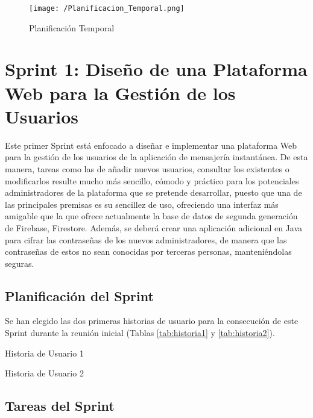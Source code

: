 \begin{figure}[!h]
	\begin{center}
		\texttt{[image: /Planificacion\_Temporal.png]}
		\caption{Planificación Temporal}
		\label{fig:plantempo}
	\end{center}
\end{figure}

\clearpage

\section{Sprint 1: Diseño de una Plataforma Web para la Gestión de los Usuarios}
Este primer Sprint está enfocado a diseñar e implementar una plataforma Web para la gestión de los usuarios de la aplicación de mensajería instantánea. De esta manera, tareas como las de añadir nuevos usuarios, consultar los existentes o modificarlos resulte mucho más sencillo, cómodo y práctico para los potenciales administradores de la plataforma que se pretende desarrollar, puesto que una de las principales premisas es su sencillez de uso, ofreciendo una interfaz más amigable que la que ofrece actualmente la base de datos de segunda generación de Firebase, Firestore. Además, se deberá crear una aplicación adicional en Java para cifrar las contraseñas de los nuevos administradores, de manera que las contraseñas de estos no sean conocidas por terceras personas, manteniéndolas seguras.

\subsection{Planificación del Sprint}
Se han elegido las dos primeras historias de usuario para la consecución de este Sprint durante la reunión inicial (Tablas \ref{tab:historia1} y \ref{tab:historia2}).

\begin{table}[!htbp]
	\centering
	{\small
		
	}
	\caption[Historia de Usuario 1]
	{Historia de Usuario 1}
	\label{tab:historia1}
\end{table}

\begin{table}[!htbp]
	\centering
	{\small
		
	}
	\caption[Historia de Usuario 2]
	{Historia de Usuario 2}
	\label{tab:historia2}
\end{table}

\subsection{Tareas del Sprint}
